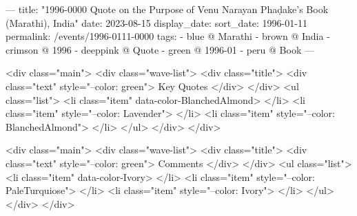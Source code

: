 ---
title: "1996-0000 Quote on the Purpose of Venu Narayan Phaḍake's Book (Marathi), India"
date: 2023-08-15
display_date: 
sort_date: 1996-01-11
permalink: /events/1996-0111-0000
tags:
  - blue @ Marathi
  - brown @ India
  - crimson @ 1996
  - deeppink @ Quote
  - green @ 1996-01
  - peru @ Book
---

<div class="main">
  <div class="wave-list">
    <div class="title">
      <div class="text" style="--color: green">
        Key Quotes
      </div>
    </div>
    <ul class="list">
        <li class="item" data-color-BlanchedAlmond>
        </li>
        <li class="item" style="--color: Lavender">
        </li>
        <li class="item" style="--color: BlanchedAlmond">
        </li>
      </ul>
  </div>
</div>

<div class="main">
  <div class="wave-list">
    <div class="title">
      <div class="text" style="--color: green">
        Comments
      </div>
    </div>
    <ul class="list">
        <li class="item" data-color-Ivory>
        </li>
        <li class="item" style="--color: PaleTurquiose">
        </li>
        <li class="item" style="--color: Ivory">
        </li>
      </ul>
  </div>
</div>